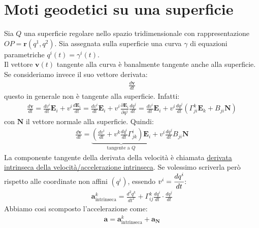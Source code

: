 \section{Moti geodetici su una superficie}
Sia $Q$ una superficie regolare nello spazio tridimensionale con rappresentazione $OP=\mathbf{r}(q^1,q^2)$. Sia assegnata sulla superficie una curva $\gamma$ di equazioni parametriche $q^i(t)=\gamma^i(t)$.\\
Il vettore $\mathbf{v}(t)$ tangente alla curva è banalmente tangente anche alla superficie. Se consideriamo invece il suo vettore derivata:
\begin{align*}
    \frac{d\mathbf{v}}{dt}
\end{align*}
questo in generale non è tangente alla superficie. Infatti:
\begin{align*}
   \frac{d\mathbf{v}}{dt} =\frac{dv^i}{dt}\mathbf{E}_i+v^i\frac{d\mathbf{E}_i}{dt}=\frac{dv^i}{dt}\mathbf{E}_i+v^i\frac{\partial \mathbf{E}_i}{\partial q^j}\frac{dq^j}{dt}=\frac{dv^i}{dt}\mathbf{E}_i+v^i\frac{dq^j}{dt}(\Gamma_{ji}^k\mathbf{E}_k+B_{ji}\mathbf{N})
\end{align*}
con $\mathbf{N}$ il vettore normale alla superficie. Quindi:
\begin{align*}
    \frac{d\mathbf{v}}{dt}=\underbrace{\left(\frac{dv^i}{dt}+v^k\frac{dq^i}{dt}\Gamma^i_{jk}\right)\mathbf{E}_i}_{\text{tangente a }Q}+v^i\frac{dq^j}{dt}B_{ji}\mathbf{N}
\end{align*}
La componente tangente della derivata della velocità è chiamata \ul{derivata intrinseca della velocità/accelerazione intrinseca}. Se volessimo scriverla però rispetto alle coordinate non affini $(q^i)$, essendo $v^i=\cfrac{dq^i}{dt}$:
\begin{align*}
    \mathbf{a}^k_{\text{intrinseca}}=\frac{d^2q^k}{dt^2}+\Gamma^k_{ij}\frac{dq^i}{dt}\cdot \frac{dq^j}{dt}
\end{align*}
Abbiamo cosi scomposto l'accelerazione come:
\begin{align*}
    \mathbf{a}=\mathbf{a}^k_{\text{intrinseca}}+\mathbf{a}_{\mathbf{N}}
\end{align*}
